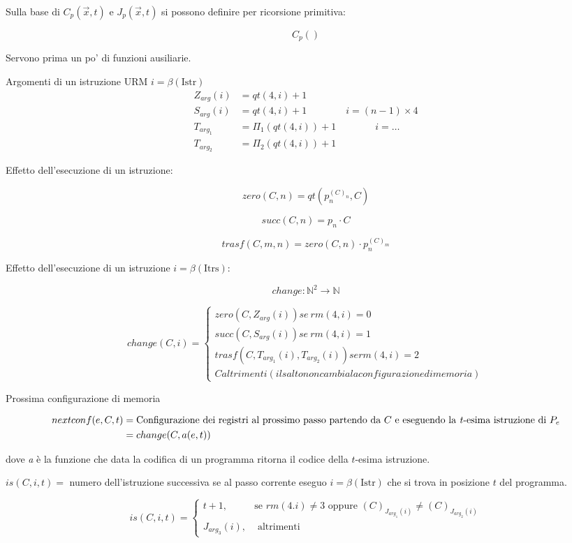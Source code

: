 Sulla base di $ C_p(\vec{x},t) $ e $ J_p(\vec{x}, t) $ si possono definire per ricorsione primitiva:

$$
C_p()
$$


Servono prima un po' di funzioni ausiliarie.

Argomenti di un istruzione URM $i = \beta(\text{Istr}) $
\begin{align*}
	Z_{arg}(i) &= qt(4,i) +1 \\
	S_{arg}(i) &= qt(4,i) +1 \qquad \qquad i = (n-1)\times 4 \\
	T_{arg_1} &= \Pi_1 (qt(4,i)) +1 \qquad \qquad i =\ldots \\
	T_{arg_2} &= \Pi_2 (qt(4,i)) +1
\end{align*}

Effetto dell'esecuzione di un istruzione:

$$
zero(C,n) = qt(p_{n}^{(C)_n} , C)
$$

$$
succ(C,n) = p_n \cdot C
$$

$$
trasf(C,m,n) = zero(C,n) \cdot p_{n}^{(C)_m}
$$

Effetto dell'esecuzione di un istruzione $ i = \beta(\text{Itrs})$:

$$
change : \mathbb{N}^2 \rightarrow \mathbb{N}
$$

$$ 
change(C,i) = \begin{cases}
zero(C, Z_{arg}(i)) se \: rm(4,i) = 0 \\
succ(C, S_{arg}(i)) se \: rm(4,i) = 1 \\
trasf(C, T_{arg_1}(i), T_{arg_2}(i)) se rm(4,i) = 2 \\
C altrimenti (il salto non cambia la configurazione di memoria)
\end{cases}
$$ 


Prossima configurazione di memoria

\begin{align*}
nextconf(e, C, t) &= \text{Configurazione dei registri al prossimo passo partendo da } C \text{ e eseguendo la \textit{t}-esima istruzione di }P_e \\
	&= change(C, a(e,t))
\end{align*}

dove \textit{a} è la funzione che data la codifica di un programma ritorna il codice della $ t $-esima istruzione.

$ is(C,i,t) =$ numero dell'istruzione successiva se al passo corrente eseguo $ i = \beta(\text{Istr}) $ che si trova in posizione $ t $ del programma.

$$
is(C,i,t) = \begin{cases}
t+1, &\text{se } rm(4.i) \neq 3 \text{ oppure } (C)_{J_{arg_1}(i)} \neq (C)_{J_{arg_2}(i)}  \\
J_{arg_3}(i), &\text{ altrimenti}
\end{cases}
$$ 

